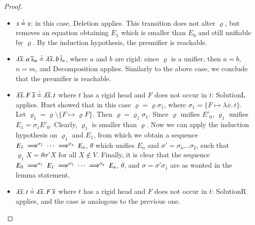 \begin{proof}
  \begin{itemize}
    \item $s \unif s$: in this case, \textsf{Deletion} applies. This transition does not
    alter $\varrho$, but removes an equation obtaining $E_1$ which is smaller
    than $E_0$ and still unifiable by $\varrho$. By the induction hypothesis, the preunifier is reachable.
    \item $\lambda \overline{x}. \, a \, \overline{s}_m \unif \lambda
    \overline{x}. \, b \, \overline{t}_n$, where $a$ and $b$ are rigid: since
    $\varrho$ is a unifier, then $a=b$, $n=m$, and \textsf{Decomposition}
    applies. Similarly to the above case, we conclude that the preunifier is reachable.
    \item $\lambda \overline{x}.\, F\,\overline{x} \unif \lambda \overline{x}.\,t$ where $t$
    has a rigid head and $F$ does not occur in $t$: \textsf{SolutionL} applies. Huet showed \cite[proof of L5.1]{gh-75-unification}
    that in this case $\varrho = \varrho\sigma_1$, where $\sigma_1 = \{ F \mapsto \lambda\overline{x}.\,t \}$.
    Let $\varrho_1 = \varrho\setminus\{F \mapsto \varrho F\}$.
    Then $\varrho = \varrho_1 \sigma_1$.
    Since $\varrho$ unifies $E'_0$, $\varrho_1$ unifies $E_1 = \sigma_1 E'_0$. Clearly, $\varrho_1$ is smaller
    than $\varrho$. Now we can apply the induction hypothesis on $\varrho_1$ and $E_1$, from which 
    we obtain a sequence $E_1 \;\Longrightarrow^{\sigma_2}\; \cdots \;\Longrightarrow^{\sigma_n}\; E_n$, $\theta$ which
    unifies $E_n$ and $\sigma' = \sigma_n \ldots \sigma_2$, such that $\varrho_1 X = \theta\sigma' X$ for all $X \not\in V$.
    Finally, it is clear that the sequence $E_0 \;\Longrightarrow^{\sigma_1}\; E_1 \;\Longrightarrow^{\sigma_2}\; \cdots \;\Longrightarrow^{\sigma_n}\; E_n$,
    $\theta$, and $\sigma = \sigma' \sigma_1$ are as wanted in the lemma statement.

    \item $\lambda \overline{x}.\,t \unif \lambda \overline{x}.\, F\,\overline{x}$ where $t$
    has a rigid head and $F$ does not occur in $t$: \textsf{SolutionR} applies, and the case is analogous to the previous one.
    

\end{itemize}
\end{proof}
